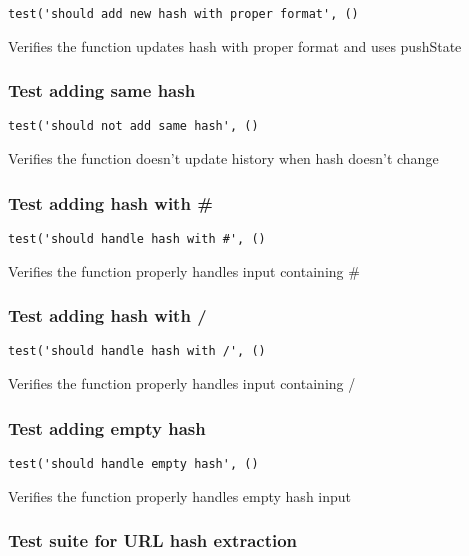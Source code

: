 \documentclass[a4paper]{article}
\begin{document}
\begin{lstlisting}
test('should add new hash with proper format', ()
\end{lstlisting}

Verifies the function updates hash with proper format
and uses pushState

\hypertarget{toc210}{}
\subsubsection{Test adding same hash}

\begin{lstlisting}
test('should not add same hash', ()
\end{lstlisting}

Verifies the function doesn't update history when hash doesn't change

\hypertarget{toc211}{}
\subsubsection{Test adding hash with \#}

\begin{lstlisting}
test('should handle hash with #', ()
\end{lstlisting}

Verifies the function properly handles input containing \#

\hypertarget{toc212}{}
\subsubsection{Test adding hash with /}

\begin{lstlisting}
test('should handle hash with /', ()
\end{lstlisting}

Verifies the function properly handles input containing /

\hypertarget{toc213}{}
\subsubsection{Test adding empty hash}

\begin{lstlisting}
test('should handle empty hash', ()
\end{lstlisting}

Verifies the function properly handles empty hash input

\hypertarget{toc214}{}
\subsubsection{Test suite for URL hash extraction}
\end{document}
